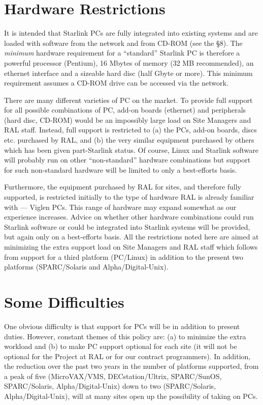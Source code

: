 \documentclass[twoside,11pt]{article}
\begin{document}
\section{Hardware Restrictions}

It is intended that Starlink PCs are fully integrated into existing
systems and are loaded with software from the network and from CD-ROM
(see the \S 8).  The {\em minimum} hardware requirement for a
``standard'' Starlink PC is therefore a powerful processor (Pentium),
16 Mbytes of memory (32 MB recommended), an ethernet interface and a sizeable hard disc
(half Gbyte or more).  This minimum requirement assumes a CD-ROM drive
can be accessed via the network.

There are many different varieties of PC on the market.  To provide
full support for all possible combinations of PC, add-on boards
(ethernet) and peripherals (hard disc, CD-ROM) would be an impossibly
large load on Site Managers and RAL staff.  Instead, 
full support is restricted to  (a) the PCs, add-on boards, discs etc.
purchased by RAL, and (b) the very similar equipment purchased by
others which has been given part-Starlink status.  Of course, Linux and
Starlink software will probably run on other ``non-standard'' hardware
combinations but support for such non-standard hardware will be limited
to only a best-efforts basis.

Furthermore, the equipment purchased by RAL for sites, and
therefore fully supported, is restricted initially to the type of
hardware RAL is already familiar with --- Viglen PCs. 
This range of hardware may expand somewhat as our experience
increases.  Advice on whether other hardware combinations could run
Starlink software or could be integrated into Starlink systems will be
provided, but again only on a best-efforts basis.  All the
restrictions noted here are aimed at minimizing the extra support load on
Site Managers and RAL staff which follows from support for a third
platform (PC/Linux) in addition to the present two platforms
(SPARC/Solaris and Alpha/Digital-Unix).

\section{Some Difficulties}

One obvious difficulty is that support for PCs will be in addition to
present duties.  However, constant themes of this policy are: (a) to
minimize the extra workload and (b) to make PC support optional for
each site (it will not be optional for the Project at RAL or for our
contract programmers).  In addition,  the reduction over the past two
years in the number of platforms supported, from a peak of five
(MicroVAX/VMS, DECstation/Ultrix, SPARC/SunOS, SPARC/Solaris,
Alpha/Digital-Unix) down to two (SPARC/Solaris, Alpha/Digital-Unix), 
will at many sites open up the possibility of taking on PCs.
\end{document}
